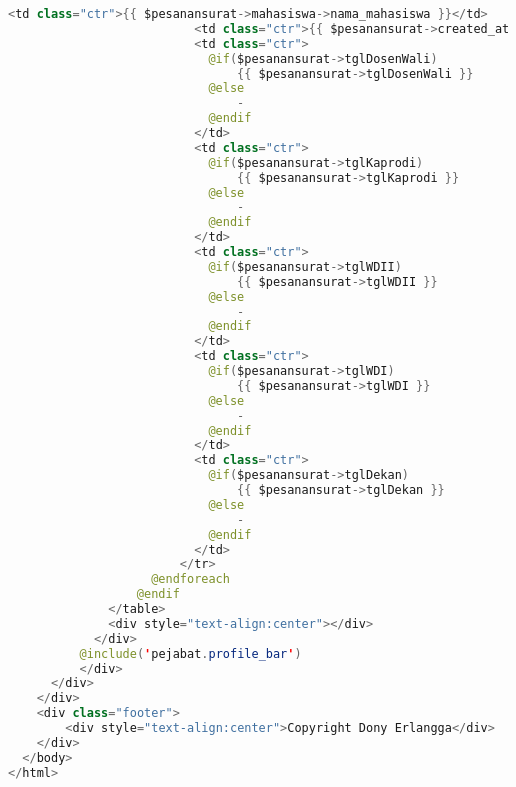 \begin{lstlisting}[language=Java,basicstyle=\tiny,caption=Persetujuan pejabat]
                          <td class="ctr">{{ $pesanansurat->mahasiswa->nama_mahasiswa }}</td>
                          <td class="ctr">{{ $pesanansurat->created_at }}</td>
                          <td class="ctr">
                            @if($pesanansurat->tglDosenWali)
                                {{ $pesanansurat->tglDosenWali }}
                            @else
                                -
                            @endif
                          </td>
                          <td class="ctr">
                            @if($pesanansurat->tglKaprodi)
                                {{ $pesanansurat->tglKaprodi }}
                            @else
                                -
                            @endif
                          </td>
                          <td class="ctr">
                            @if($pesanansurat->tglWDII)
                                {{ $pesanansurat->tglWDII }}
                            @else
                                -
                            @endif
                          </td>
                          <td class="ctr">
                            @if($pesanansurat->tglWDI)
                                {{ $pesanansurat->tglWDI }}
                            @else
                                -
                            @endif
                          </td>
                          <td class="ctr">
                            @if($pesanansurat->tglDekan)
                                {{ $pesanansurat->tglDekan }}
                            @else
                                -
                            @endif
                          </td>
                        </tr>
                    @endforeach
                  @endif
              </table>
              <div style="text-align:center"></div>
            </div>
          @include('pejabat.profile_bar')
          </div>
      </div>
    </div>
    <div class="footer">
        <div style="text-align:center">Copyright Dony Erlangga</div>
    </div>
  </body>
</html>

\end{lstlisting}
